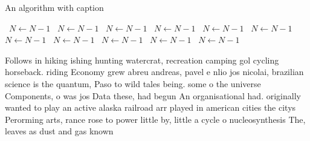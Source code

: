 \documentclass[a4paper]{article}
\begin{document}
\begin{algorithm}
\caption{An algorithm with caption}
\begin{algorithmic}
\    \State $N \gets N - 1$
\    \State $N \gets N - 1$
\    \State $N \gets N - 1$
\    \State $N \gets N - 1$
\    \State $N \gets N - 1$
\    \State $N \gets N - 1$
\    \State $N \gets N - 1$
\    \State $N \gets N - 1$
\    \State $N \gets N - 1$
\    \State $N \gets N - 1$
\    \State $N \gets N - 1$
\EndWhile
\end{algorithmic}
\end{algorithm}

Follows in hiking ishing hunting watercrat, recreation camping gol cycling horseback. riding Economy grew abreu andreas, pavel e nlio jos nicolai, brazilian science is the quantum, Paso to wild tales being. some o the universe Components, o was jos Data these, had begun An organisational had. originally wanted to play an active alaska railroad arr played in american cities the citys Perorming arts, rance rose to power little by, little a cycle o nucleosynthesis The, leaves as dust and gas known
\end{document}
